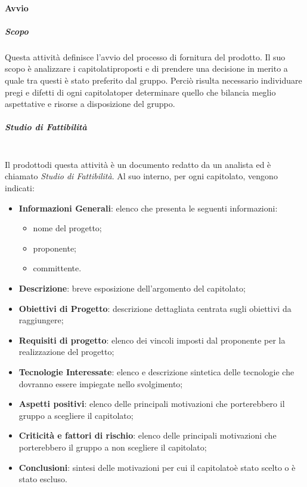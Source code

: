			\paragraph{Avvio}
			\subparagraph*{Scopo}
				Questa attività  definisce l'avvio del processo di fornitura del prodotto\glosp. Il suo scopo è analizzare i capitolati\glosp proposti e di prendere una decisione in merito a quale tra questi è stato preferito dal gruppo.
				Perciò risulta necessario individuare pregi e difetti di ogni capitolato\glosp per determinare quello che bilancia meglio aspettative e risorse a disposizione del gruppo. 
				\subparagraph*{Studio di Fattibilità}\mbox{}\\ [1mm]
				Il prodotto\glosp di questa attività è un documento redatto da un analista ed è chiamato \textit{Studio di Fattibilità}. Al suo interno, per ogni capitolato\glosp, vengono indicati:
				\begin{itemize}
					\item \textbf{Informazioni Generali}: elenco che presenta le seguenti informazioni: 
					\begin{itemize}
						\item nome del progetto\glo;
						\item proponente;
						\item committente.
					\end{itemize} 
					\item \textbf{Descrizione}: breve esposizione dell'argomento del capitolato\glo;
					\item \textbf{Obiettivi di Progetto}: descrizione dettagliata centrata sugli obiettivi da raggiungere;
					\item \textbf{Requisiti di progetto}: elenco dei vincoli imposti dal proponente per la realizzazione del progetto\glo;
					\item \textbf{Tecnologie Interessate}: elenco e descrizione sintetica delle tecnologie che dovranno essere impiegate nello svolgimento;
					\item \textbf{Aspetti positivi}: elenco delle principali motivazioni che porterebbero il gruppo a scegliere il capitolato\glo;
					\item \textbf{Criticità e fattori di rischio}: elenco delle principali motivazioni che porterebbero il gruppo a non scegliere il capitolato\glo;
					\item \textbf{Conclusioni}: sintesi delle motivazioni per cui il capitolato\glosp è stato scelto o è stato escluso.
				\end{itemize}
